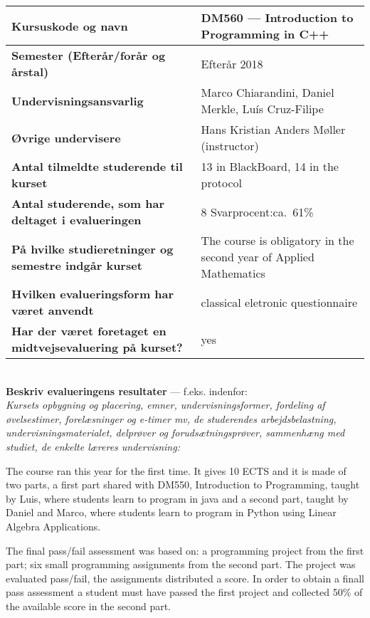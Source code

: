 \documentclass[11pt]{article}
\begin{document}
\tabulinesep=1.2mm
\begin{tabu} to 1.0 \hline
Kursuskode og navn &  DM560 --- Introduction to Programming in C++ \\\hline
Semester {\normalfont (Efterår/forår og årstal)} & Efterår 2018 \\\hline
Undervisnings\-ansvarlig &  Marco Chiarandini, Daniel Merkle, Luís Cruz-Filipe \\\hline
Øvrige undervisere &  Hans Kristian Anders Møller (instructor) \\\hline
Antal tilmeldte studerende til kurset & 13 in BlackBoard, 14 in the protocol \\\hline
Antal studerende, som har deltaget i evalueringen &  8  \hfill
Svarprocent:ca.~61\% \\\hline
På hvilke studieretninger og semestre indgår kurset &  The course is obligatory in the second year of Applied Mathematics \\\hline
Hvilken evalueringsform har været anvendt &  classical eletronic questionnaire \\\hline
Har der været foretaget en midtvejsevaluering på kurset? &  yes  \\ 
\hline
\end{tabu}

~\\[1cm]\textcolor{sdublue}{{\bf Beskriv evalueringens resultater} ---
  f.eks. indenfor:\\ {\small \em Kursets opbygning og placering,
    emner, undervisningsformer, fordeling af øvelsestimer,
    forelæsninger og e-timer mv, de studerendes arbejdsbelastning,
    undervisningsmaterialet, delprøver og forudsætningsprøver,
    sammenhæng med studiet, de enkelte læreres undervisning:}}



The course ran this year for the first time. It gives 10 ECTS and it
is made of two parts, a first part shared with DM550, Introduction to
Programming, taught by Luis, where students learn to program in java
and a second part, taught by Daniel and Marco, where students learn to
program in Python using Linear Algebra Applications.

The final pass/fail assessment was based on: a programming project
from the first part; six small programming assignments from the second
part. The project was evaluated pass/fail, the assignments distributed
a score. In order to obtain a finall pass assessment a student
must have passed the first project and collected 50\% of the available
score in the second part.
\end{document}
